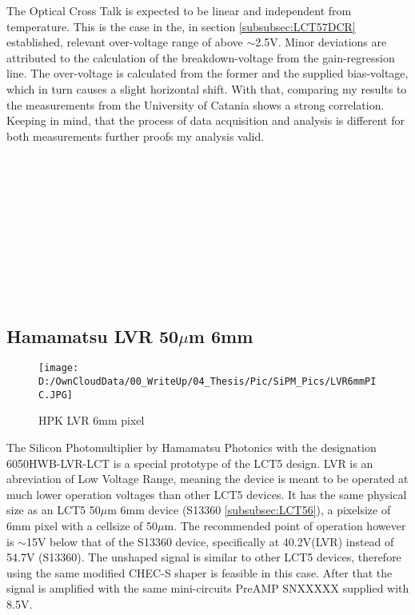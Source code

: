 \documentclass[article,type=msc,colorback,accentcolor=tud9c]{tudthesis}
\begin{document}
The Optical Cross Talk is expected to be linear and independent from temperature. This is the case in the, in section \ref{subsubsec:LCT57DCR} established, relevant over-voltage range of above $\sim$2.5V. Minor deviations are attributed to the calculation of the breakdown-voltage from the gain-regression line. The over-voltage is calculated from the former and the supplied bias-voltage, which in turn causes a slight horizontal shift. With that, comparing my results to the measurements from the University of Catania shows a strong correlation. Keeping in mind, that the process of data acquisition and analysis is different for both measurements further proofs my analysis valid. 
\\\\\\\\\\\\\\\\\\\\\\



\newpage
\subsection{Hamamatsu LVR 50$\mu$m 6mm}
\begin{wrapfigure}{R}{0.4\textwidth}
\centering
\texttt{[image: D:/OwnCloudData/00\_WriteUp/04\_Thesis/Pic/SiPM\_Pics/LVR6mmPIC.JPG]}
\caption{\label{fig:LVR6_pixel}HPK LVR 6mm pixel}
\end{wrapfigure}

The Silicon Photomultiplier by Hamamatsu Photonics with the designation 6050HWB-LVR-LCT is a special prototype of the LCT5 design. LVR is an abreviation of Low Voltage Range, meaning the device is meant to be operated at much lower operation voltages than other LCT5 devices. It has the same physical size as an LCT5 50$\mu$m 6mm device (S13360 \ref{subsubsec:LCT56}), a pixelsize of 6mm pixel with a cellsize of 50$\mu$m. The recommended point of operation however is $\sim$15V below that of the S13360 device, specifically at 40.2V(LVR) instead of 54.7V (S13360). The unshaped signal is similar to other LCT5 devices, therefore using the same modified CHEC-S shaper is feasible in this case. After that the signal is amplified with the same mini-circuits PreAMP SNXXXXX supplied with 8.5V.
\\
\end{document}
